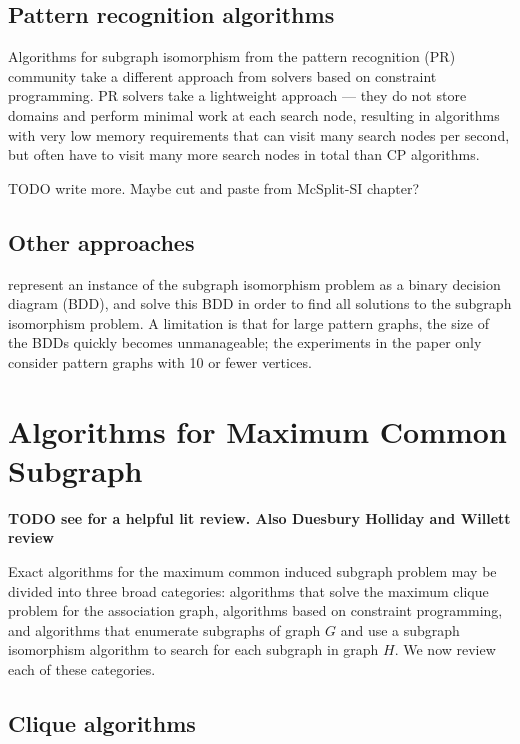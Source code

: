 \subsection{Pattern recognition algorithms}

Algorithms for subgraph isomorphism from the pattern recognition (PR) community
take a different approach from solvers based on constraint programming.  PR
solvers take a lightweight approach --- they do not store domains and perform
minimal work at each search node, resulting in algorithms with very low memory
requirements that can visit many search nodes per second, but often have to
visit many more search nodes in total than CP algorithms.

TODO write more. Maybe cut and paste from McSplit-SI chapter?

\subsection{Other approaches}

\citet{DBLP:conf/RelMiCS/CortadellaV00} represent an instance of the subgraph
isomorphism problem as a binary decision diagram (BDD), and solve this BDD
in order to find all solutions to the subgraph isomorphism problem.  A limitation
is that for large
pattern graphs, the size of the BDDs quickly becomes unmanageable; the experiments
in the paper only consider pattern graphs with 10 or fewer vertices.

\section{Algorithms for Maximum Common Subgraph} 

\textbf{TODO see \citet{DBLP:journals/jcamd/RaymondW02a} for a helpful lit review.
Also Duesbury Holliday and Willett review}

Exact algorithms for the maximum common induced subgraph problem may be divided
into three broad categories:
algorithms that solve the maximum clique problem for the association graph,
algorithms based on constraint programming,
and algorithms that enumerate subgraphs of graph $G$ and use a subgraph
isomorphism algorithm to search for each subgraph in graph $H$.  We now review
each of these categories.

\subsection{Clique algorithms}


